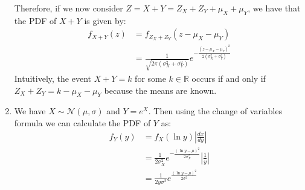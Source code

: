 \documentclass[submit]{harvardml}
\theoremstyle{plain}
\begin{document}
\begin{enumerate}[label=(\alph*)]
Therefore, if we now consider $Z = X+Y = Z_X + Z_Y + \mu_X + \mu_Y$,  we have that the PDF of $X + Y$ is given by:
\begin{align*}
f_{X+Y}(z) &= f_{Z_X + Z_Y}(z - \mu_X - \mu_Y) \\
&= \frac{1}{\sqrt{2\pi(\sigma_X^2 + \sigma_Y^2)}}e^{-\frac{(z-\mu_X-\mu_Y)^2}{2(\sigma_X^2 + \sigma_Y^2)}}
\end{align*}
Intuitively, the event $X + Y = k$ for some $k \in \mathbb{R}$ occurs if and only if $Z_X + Z_Y = k - \mu_X -\mu_Y$ because the means are known.
\item We have $X \sim \mathcal{N}(\mu, \sigma)$ and $Y = e^X$. Then using the change of variables formula we can calculate the PDF of $Y$ as:
\begin{align*}
f_{Y}(y) &= f_X(\ln y) \left|\frac{dx}{dy}\right| \\
&= \frac{1}{2\sigma_X^2}e^{-\frac{(\ln y - \mu)^2}{2\sigma_X^2}} \left|\frac{1}{y} \right| \\
&= \frac{1}{2y\sigma^2}e^{\frac{(\ln y - \mu)^2}{2\sigma^2}} \tag{restrict support to $y > 0$}
\end{align*}
\end{enumerate}
\end{document}
